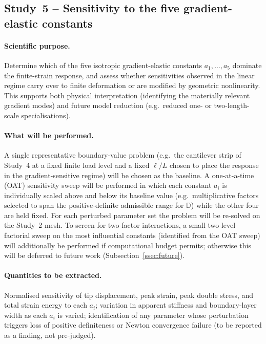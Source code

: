 \documentclass[11pt]{article}
\begin{document}
\subsection{Study~5 -- Sensitivity to the five gradient-elastic
  constants}
\label{ssec:s9_study5}

\paragraph{Scientific purpose.}
Determine which of the five isotropic gradient-elastic constants
$a_{1},\ldots,a_{5}$ dominate the finite-strain response, and
assess whether sensitivities observed in the linear regime
carry over to finite deformation or are modified by geometric
nonlinearity.  This supports both physical interpretation
(identifying the materially relevant gradient modes) and
future model reduction (e.g.\ reduced one- or two-length-scale
specialisations).

\paragraph{What will be performed.}
A single representative boundary-value problem (e.g.\ the
cantilever strip of Study~4 at a fixed finite load level and a
fixed $\ell/L$ chosen to place the response in the
gradient-sensitive regime) will be chosen as the baseline.
A one-at-a-time (OAT) sensitivity sweep will be performed in
which each constant $a_i$ is individually scaled above and
below its baseline value (e.g.\ multiplicative factors
selected to span the positive-definite admissible range for
$\mathbb{D}$) while the other four are held fixed.  For each
perturbed parameter set the problem will be re-solved on the
Study~2 mesh.  To screen for two-factor interactions, a
small two-level factorial sweep on the most influential
constants (identified from the OAT sweep) will additionally
be performed if computational budget permits; otherwise this
will be deferred to future work (Subsection~\ref{ssec:future}).

\paragraph{Quantities to be extracted.}
Normalised sensitivity of tip displacement, peak strain, peak
double stress, and total strain energy to each $a_i$;
variation in apparent stiffness and boundary-layer width as
each $a_i$ is varied; identification of any parameter whose
perturbation triggers loss of positive definiteness or
Newton convergence failure (to be reported as a finding, not
pre-judged).
\end{document}
